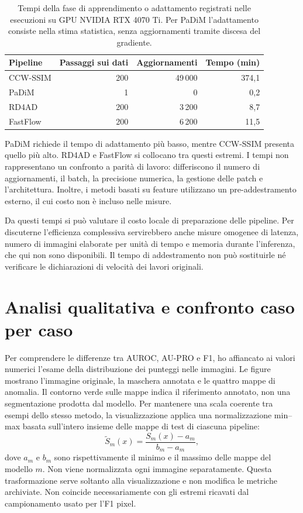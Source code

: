 \begin{table}[htbp]
\centering
\small
\begin{tabularx}{\textwidth}{Yrrr}
\hline
Pipeline & Passaggi sui dati & Aggiornamenti & Tempo (min) \\
\hline
CCW-SSIM & 200 & 49\,000 & 374,1 \\
PaDiM & 1 & 0 & 0,2 \\
RD4AD & 200 & 3\,200 & 8,7 \\
FastFlow & 200 & 6\,200 & 11,5 \\
\hline
\end{tabularx}
\caption{Tempi della fase di apprendimento o adattamento registrati nelle esecuzioni su GPU NVIDIA RTX 4070 Ti. Per PaDiM l'adattamento consiste nella stima statistica, senza aggiornamenti tramite discesa del gradiente.}
\label{tab:cap4-costi}
\end{table}

PaDiM richiede il tempo di adattamento più basso, mentre CCW-SSIM presenta quello più alto. RD4AD e FastFlow si collocano tra questi estremi. I tempi non rappresentano un confronto a parità di lavoro: differiscono il numero di aggiornamenti, il batch, la precisione numerica, la gestione delle patch e l'architettura. Inoltre, i metodi basati su feature utilizzano un pre-addestramento esterno, il cui costo non è incluso nelle misure.

Da questi tempi si può valutare il costo locale di preparazione delle pipeline. Per discuterne l'efficienza complessiva servirebbero anche misure omogenee di latenza, numero di immagini elaborate per unità di tempo e memoria durante l'inferenza, che qui non sono disponibili. Il tempo di addestramento non può sostituirle né verificare le dichiarazioni di velocità dei lavori originali.

\section{Analisi qualitativa e confronto caso per caso}
\label{sec:cap4-qualitativo}

Per comprendere le differenze tra AUROC, AU-PRO e F1, ho affiancato ai valori numerici l'esame della distribuzione dei punteggi nelle immagini. Le figure mostrano l'immagine originale, la maschera annotata e le quattro mappe di anomalia. Il contorno verde sulle mappe indica il riferimento annotato, non una segmentazione prodotta dal modello. Per mantenere una scala coerente tra esempi dello stesso metodo, la visualizzazione applica una normalizzazione min--max basata sull'intero insieme delle mappe di test di ciascuna pipeline:
\begin{equation}
\widetilde{S}_m(x)=\frac{S_m(x)-a_m}{b_m-a_m},
\end{equation}
dove $a_m$ e $b_m$ sono rispettivamente il minimo e il massimo delle mappe del modello $m$. Non viene normalizzata ogni immagine separatamente. Questa trasformazione serve soltanto alla visualizzazione e non modifica le metriche archiviate. Non coincide necessariamente con gli estremi ricavati dal campionamento usato per l'F1 pixel.

